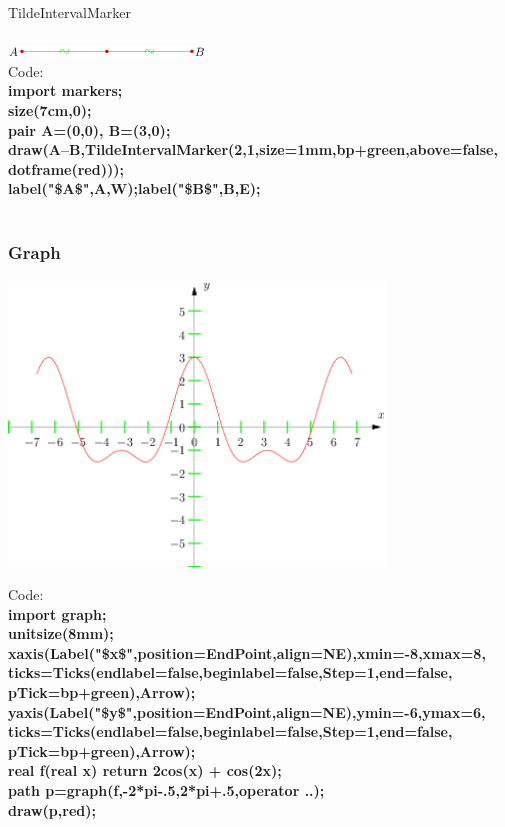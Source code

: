 \documentclass[a4paper]{report}
\begin{document}
{\color{blue} TildeIntervalMarker}\\\\
\includegraphics{images/Des4.png}\\
Code:\\
\textbf{import markers;\\
size(7cm,0);\\
pair A=(0,0), B=(3,0);\\
draw(A--B,TildeIntervalMarker(2,1,size=1mm,bp+green,above=false,\\
dotframe(red)));\\
label("\$A\$",A,W);label("\$B\$",B,E);}\\\\
\subsubsection{Graph}
\begin{center}
\includegraphics[width=10cm]{images/Des5.png}\\
\end{center}
Code:\\
\textbf{import graph;\\
unitsize(8mm);\\
xaxis(Label("\$x\$",position=EndPoint,align=NE),xmin=-8,xmax=8,\\
ticks=Ticks(endlabel=false,beginlabel=false,Step=1,end=false,\\
pTick=bp+green),Arrow);\\
yaxis(Label("\$y\$",position=EndPoint,align=NE),ymin=-6,ymax=6,\\
ticks=Ticks(endlabel=false,beginlabel=false,Step=1,end=false,\\
pTick=bp+green),Arrow);\\
real f(real x) {return 2cos(x) + cos(2x);}\\
path p=graph(f,-2*pi-.5,2*pi+.5,operator ..);\\
draw(p,red);}\\
\end{document}
